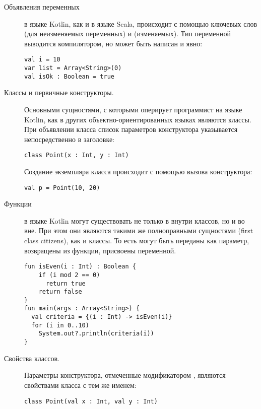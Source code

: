 \begin{description}
\item[Объявления переменных] в языке Kotlin, как и в языке Scala, происходит с помощью ключевых слов  (для неизменяемых переменных)
и  (изменяемых). Тип переменной выводится компилятором, но может быть написан и явно:
\begin{code}\begin{lstlisting}
val i = 10
var list = Array<String>(0)
val isOk : Boolean = true
\end{lstlisting}\end{code}
	\item[Классы и первичные конструкторы.] Основными сущностями, с которыми оперирует программист на языке Kotlin, как в других объектно-ориентированных языках являются классы. При объявлении класса список параметров конструктора указывается непосредственно в заголовке:
\begin{code}\begin{lstlisting}
class Point(x : Int, y : Int)
\end{lstlisting}\end{code}
	Создание экземпляра класса происходит с помощью вызова конструктора:
\begin{code}\begin{lstlisting}
val p = Point(10, 20)
\end{lstlisting}\end{code}
	\item[Функции] в языке Kotlin могут существовать не только в внутри классов, но и во вне. При этом они являются такими же полноправными сущностями (first class citizens), как и классы. То есть могут быть переданы как параметр, возвращены из функции, присвоены переменной.
\begin{code}\begin{lstlisting}
fun isEven(i : Int) : Boolean {
    if (i mod 2 == 0)
      return true
    return false
}
fun main(args : Array<String>) {
  val criteria = {(i : Int) -> isEven(i)}
  for (i in 0..10)
    System.out?.println(criteria(i))
}
\end{lstlisting}\end{code}
	\item[Свойства классов.] Параметры конструктора, отмеченные модификатором , являются свойствами класса с тем же именем:
\begin{code}\begin{lstlisting}
class Point(val x : Int, val y : Int)


\end{lstlisting}
\end{code}
\end{description}
